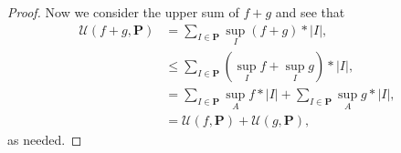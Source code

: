 \documentclass[twoside]{article}
\begin{document}
    \begin{proof}
        Now we consider the upper sum of $f + g$ and see that
        \begin{align*}
            \mathcal{U}(f + g, \bm{P}) &= \sum_{I \in \bm{P}}\sup_{I} (f + g) * |I|,\\ 
                                       &\leq \sum_{I \in \bm{P}} (\sup_{I} f + \sup_{I} g)*|I|,\\ 
                                       &= \sum_{I \in \bm{P}} \sup_{A} f * |I| + \sum_{I \in \bm{P}} \sup_{A} g * |I|,\\ 
                                       &= \mathcal{U}(f, \bm{P}) + \mathcal{U}(g, \bm{P}),
        \end{align*}
        as needed.
    \end{proof}
\end{document}

